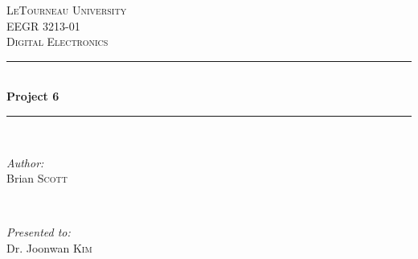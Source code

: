 \begin{titlepage}
\newcommand{\HRule}{\rule{\linewidth}{0.4mm}} %

\center %


\textsc{\LARGE LeTourneau University}\\[1.5cm] %
\textsc{\Large EEGR 3213-01}\\[0.5cm] %
\textsc{\large Digital Electronics}\\[0.5cm] %


\HRule \\[0.4cm]
{\huge \bfseries Project 6}\\[2mm] %
\HRule \\[3cm]

\begin{minipage}{0.35\textwidth}
	\begin{flushleft} \Large
		\emph{Author:}\\
		Brian \textsc{Scott} %
	\end{flushleft}
\end{minipage}
~
\begin{minipage}{0.35\textwidth}
	\begin{flushright} \Large
		\emph{Presented to:} \\
		Dr. Joonwan \textsc{Kim} %
	\end{flushright}
\end{minipage}\\[4cm]



\end{titlepage}
